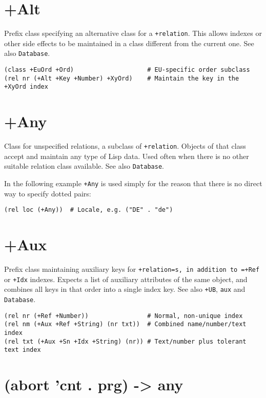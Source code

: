  
\section{+Alt}
\label{sec-8-1-1-4}


Prefix class specifying an alternative class for a \texttt{+relation}. This
allows indexes or other side effects to be maintained in a class
different from the current one. See also \texttt{Database}.


\begin{verbatim}
(class +EuOrd +Ord)                    # EU-specific order subclass
(rel nr (+Alt +Key +Number) +XyOrd)    # Maintain the key in the +XyOrd index
\end{verbatim}

 
\section{+Any}
\label{sec-8-1-1-5}


Class for unspecified relations, a subclass of \texttt{+relation}. Objects of
that class accept and maintain any type of Lisp data. Used often when
there is no other suitable relation class available. See also
\texttt{Database}.

In the following example \texttt{+Any} is used simply for the reason that there
is no direct way to specify dotted pairs:


\begin{verbatim}
(rel loc (+Any))  # Locale, e.g. ("DE" . "de")
\end{verbatim}

 
\section{+Aux}
\label{sec-8-1-1-6}


Prefix class maintaining auxiliary keys for \texttt{+relation=s, in addition to =+Ref} or \texttt{+Idx} indexes. Expects a list of auxiliary attributes of the
same object, and combines all keys in that order into a single index
key. See also \texttt{+UB}, \texttt{aux} and \texttt{Database}.


\begin{verbatim}
(rel nr (+Ref +Number))                # Normal, non-unique index
(rel nm (+Aux +Ref +String) (nr txt))  # Combined name/number/text index
(rel txt (+Aux +Sn +Idx +String) (nr)) # Text/number plus tolerant text index
\end{verbatim}

 
\section{(abort 'cnt . prg) -> any}
\label{sec-8-1-1-7}


